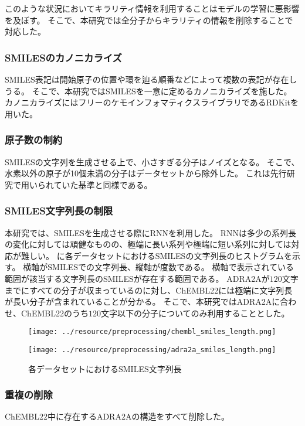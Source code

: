 このような状況においてキラリティ情報を利用することはモデルの学習に悪影響を及ぼす。
そこで、本研究では全分子からキラリティの情報を削除することで対応した。

\subsubsection{SMILESのカノニカライズ}

SMILES表記は開始原子の位置や環を辿る順番などによって複数の表記が存在しうる。
そこで、本研究ではSMILESを一意に定めるカノニカライズを施した。
カノニカライズにはフリーのケモインフォマティクスライブラリであるRDKit\cite{rdkit}を用いた。

\subsubsection{原子数の制約}

SMILESの文字列を生成させる上で、小さすぎる分子はノイズとなる。
そこで、水素以外の原子が10個未満の分子はデータセットから除外した。
これは先行研究\cite{Blaschke2018}で用いられていた基準と同様である。

\subsubsection{SMILES文字列長の制限}

本研究では、SMILESを生成させる際にRNNを利用した。
RNNは多少の系列長の変化に対しては頑健なものの、極端に長い系列や極端に短い系列に対しては対応が難しい。
に各データセットにおけるSMILESの文字列長のヒストグラムを示す。
横軸がSMILESでの文字列長、縦軸が度数である。
横軸で表示されている範囲が該当する文字列長のSMILESが存在する範囲である。
ADRA2Aが$120$文字までにすべての分子が収まっているのに対し、ChEMBL22には極端に文字列長が長い分子が含まれていることが分かる。
そこで、本研究ではADRA2Aに合わせ、ChEMBL22のうち$120$文字以下の分子についてのみ利用することとした。
\begin{figure}[tbp]
    \begin{minipage}[h]{1\hsize}
    \centering
    \texttt{[image: ../resource/preprocessing/chembl\_smiles\_length.png]} 
     \label{fig:chembl_smiles_length}
    \end{minipage}
    \begin{minipage}[h]{1\hsize}    
    \centering
    \texttt{[image: ../resource/preprocessing/adra2a\_smiles\_length.png]}
     \label{fig:adra2a_smiles_length}
    \end{minipage}
\caption{各データセットにおけるSMILES文字列長} \label{fig:smiles_length}
\end{figure}

\subsubsection{重複の削除}

ChEMBL22中に存在するADRA2Aの構造をすべて削除した。
